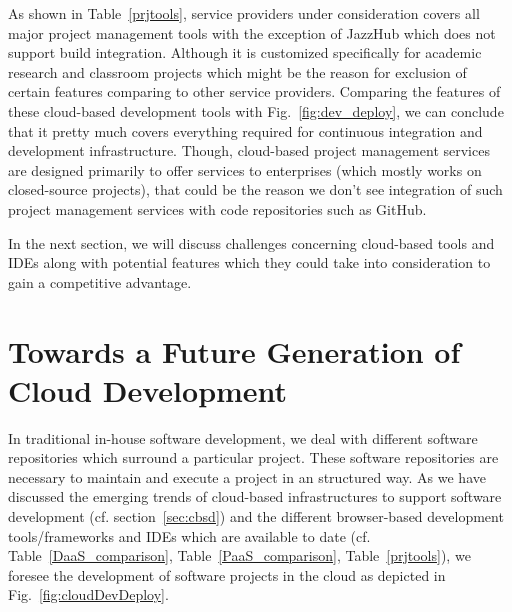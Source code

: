 \documentclass[11pt,fleqn,twoside]{article}
\begin{document}
As shown in Table~\ref{prjtools}, service providers under consideration covers all major project management tools with the exception of JazzHub which does not support build integration. Although it is customized specifically for academic research and classroom projects which might be the reason for exclusion of certain features comparing to other service providers. Comparing the features of these cloud-based development tools with Fig.~\ref{fig:dev_deploy}, we can conclude that it pretty much covers everything required for continuous integration and development infrastructure. Though, cloud-based project management services are designed primarily to offer services to enterprises (which mostly works on closed-source projects), that could be the reason we don't see integration of such project management services with code repositories such as GitHub.

In the next section, we will discuss challenges concerning cloud-based tools and IDEs along with potential features which they could take into consideration to gain a competitive advantage.


\section{Towards a Future Generation of Cloud Development} \label{sec:challenge}


In traditional in-house software development, we deal with different software repositories which surround a particular project. These software repositories are necessary to maintain and execute a project in an structured way. As we have discussed the emerging trends of cloud-based infrastructures to support software development (cf. section~\ref{sec:cbsd}) and the different browser-based development tools/frameworks and IDEs which are available to date (cf. Table~\ref{DaaS_comparison}, Table~\ref{PaaS_comparison}, Table~\ref{prjtools}), we foresee the development of software projects in the cloud as depicted in Fig.~\ref{fig:cloudDevDeploy}. 
\end{document}
